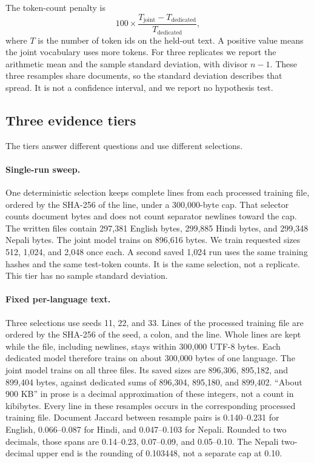 \documentclass[10pt,twocolumn]{article}
\begin{document}
The token-count penalty is
\begin{equation}
100 \times \frac{T_{\text{joint}} - T_{\text{dedicated}}}{T_{\text{dedicated}}},
\label{eq:penalty}
\end{equation}
where $T$ is the number of token ids on the held-out text.
A positive value means the joint vocabulary uses more tokens.
For three replicates we report the arithmetic mean and the sample standard deviation, with divisor $n-1$.
These three resamples share documents, so the standard deviation describes that spread.
It is not a confidence interval, and we report no hypothesis test.

\subsection{Three evidence tiers}

The tiers answer different questions and use different selections.

\paragraph{Single-run sweep.}
One deterministic selection keeps complete lines from each processed training file, ordered by the SHA-256 of the line, under a 300{,}000-byte cap.
That selector counts document bytes and does not count separator newlines toward the cap.
The written files contain 297{,}381 English bytes, 299{,}885 Hindi bytes, and 299{,}348 Nepali bytes.
The joint model trains on 896{,}616 bytes.
We train requested sizes 512, 1{,}024, and 2{,}048 once each.
A second saved 1{,}024 run uses the same training hashes and the same test-token counts.
It is the same selection, not a replicate.
This tier has no sample standard deviation.

\paragraph{Fixed per-language text.}
Three selections use seeds 11, 22, and 33.
Lines of the processed training file are ordered by the SHA-256 of the seed, a colon, and the line.
Whole lines are kept while the file, including newlines, stays within 300{,}000 UTF-8 bytes.
Each dedicated model therefore trains on about 300{,}000 bytes of one language.
The joint model trains on all three files.
Its saved sizes are 896{,}306, 895{,}182, and 899{,}404 bytes, against dedicated sums of 896{,}304, 895{,}180, and 899{,}402.
``About 900 KB'' in prose is a decimal approximation of these integers, not a count in kibibytes.
Every line in these resamples occurs in the corresponding processed training file.
Document Jaccard between resample pairs is 0.140--0.231 for English, 0.066--0.087 for Hindi, and 0.047--0.103 for Nepali.
Rounded to two decimals, those spans are 0.14--0.23, 0.07--0.09, and 0.05--0.10.
The Nepali two-decimal upper end is the rounding of 0.103448, not a separate cap at 0.10.
\end{document}
